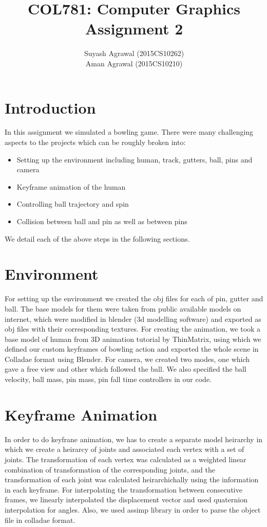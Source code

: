 \documentclass[12pt,a4paper]{article}
\title{COL781: Computer Graphics\\Assignment 2}
\author{Suyash Agrawal (2015CS10262)\\Aman Agrawal (2015CS10210)}
\begin{document}
\maketitle
\section{Introduction}
    In this assignment we simulated a bowling game. There were many challenging aspects to the projects which can be roughly broken into:
    \begin{itemize}
        \item Setting up the environment including human, track, gutters, ball, pins and camera
        \item Keyframe animation of the human
        \item Controlling ball trajectory and spin
        \item Collision between ball and pin as well as between pins
    \end{itemize}
    We detail each of the above steps in the following sections.

\section{Environment}
    For setting up the environment we created the obj files for each of pin, gutter and ball. The base models for them were taken from public available models on internet, which were modified in blender (3d modelling software) and exported as obj files with their corresponding textures.
    For creating the animation, we took a base model of human from 3D animation tutorial by ThinMatrix, using which we defined our custom keyframes of bowling action and exported the whole scene in Colladae format using Blender.
    For camera, we created two modes, one which gave a free view and other which followed the ball.
    We also specified the ball velocity, ball mass, pin mass, pin fall time controllers in our code.

\section{Keyframe Animation}
    In order to do keyfrane animation, we has to create a separate model heirarchy in which we create a heirarcy of joints and associated each vertex with a set of joints. The transformation of each vertex was calculated as a weighted linear combination of transformation of the corresponding joints, and the transformation of each joint was calculated heirarchichally using the information in each keyframe.
    For interpolating the transformation between consecutive frames, we linearly interpolated the displacement vector and used quaternion interpolation for angles.
    Also, we used assimp library in order to parse the object file in colladae format.
\end{document}
